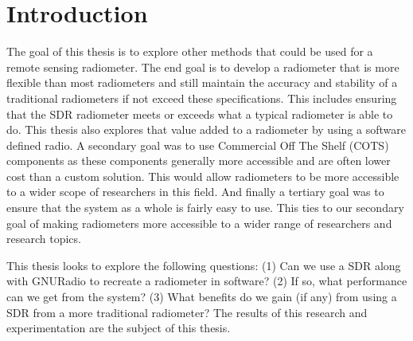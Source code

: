 \section{Introduction}
The goal of this thesis is to explore other methods that could be used for a remote sensing radiometer.  The end goal is to develop a radiometer that is more flexible than most radiometers and still maintain the accuracy and stability of a traditional radiometers if not exceed these specifications.  This includes ensuring that the SDR radiometer meets or exceeds what a typical radiometer is able to do.  This thesis also explores that value added to a radiometer by using a software defined radio.  A secondary goal was to use Commercial Off The Shelf (COTS) components as these components generally more accessible and are often lower cost than a custom solution.  This would allow radiometers to be more accessible to a wider scope of researchers in this field.  And finally a tertiary goal was to ensure that the system as a whole is fairly easy to use.  This ties to our secondary goal of making radiometers more accessible to a wider range of researchers and research topics.


This thesis looks to explore the following questions: (1) Can we use a SDR along with GNURadio to recreate a radiometer in software?  (2) If so, what performance can we get from the system?  (3) What benefits do we gain (if any) from using a SDR from a more traditional radiometer?  The results of this research and experimentation are the subject of this thesis.


